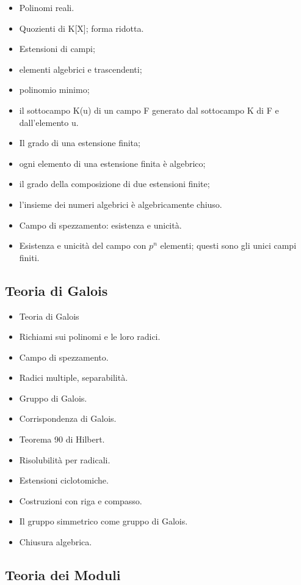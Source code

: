 \documentclass[a4paper,10pt]{article}
\begin{document}
\begin{itemize}
 \item Polinomi reali.
 \item Quozienti di K[X]; forma ridotta. 
 \item Estensioni di campi; 
 \item elementi algebrici e trascendenti;
 \item polinomio minimo; 
 \item il sottocampo K(u) di un campo F generato dal sottocampo K di F e dall'elemento u. 
 \item Il grado di una estensione finita; 
 \item ogni elemento di una estensione finita è algebrico; 
 \item il grado della composizione di due estensioni finite; 
 \item l'insieme dei numeri algebrici è algebricamente chiuso. 
 \item Campo di spezzamento: esistenza e unicità. 
 \item Esistenza e unicità del campo con $p^n$ elementi; questi sono gli unici campi finiti.
 \end{itemize}




\subsection*{Teoria di Galois}
\begin{itemize}
 \item Teoria di Galois
 \item Richiami sui polinomi e le loro radici. 
 \item Campo di spezzamento. 
 \item Radici multiple, separabilità.
 \item Gruppo di Galois. 
 \item Corrispondenza di Galois. 
 \item Teorema 90 di Hilbert.
 \item Risolubilità per radicali. 
 \item Estensioni ciclotomiche.
 \item Costruzioni con riga e compasso.
 \item Il gruppo simmetrico come gruppo di Galois.
 \item Chiusura algebrica.
\end{itemize}

\subsection*{Teoria dei Moduli}
\end{document}
